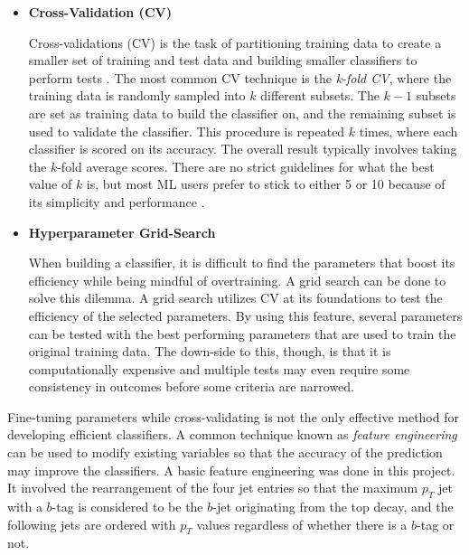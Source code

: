 \begin{itemize}
    \item \textbf{Cross-Validation (CV)} \par
    Cross-validations (CV) is the task of partitioning training data to create a smaller set of training and test data and building smaller classifiers to perform tests \cite{james2013introduction}. The most common CV technique is the \textit{k-fold CV}, where the training data is randomly sampled into $k$ different subsets. The $k-1$ subsets are set as training data to build the classifier on, and the remaining subset is used to validate the classifier. This procedure is repeated $k$ times, where each classifier is scored on its accuracy. The overall result typically involves taking the $k$-fold average scores.  There are no strict guidelines for what the best value of $k$ is, but most ML users prefer to stick to either 5 or 10 because of its simplicity and performance \cite{james2013introduction}. \\
    
    \item \textbf{Hyperparameter Grid-Search} \par
    When building a classifier, it is difficult to find the parameters that boost its efficiency while being mindful of overtraining. A grid search can be done to solve this dilemma. A grid search utilizes CV at its foundations to test the efficiency of the selected parameters. By using this feature, several parameters can be tested with the best performing parameters that are used to train the original training data. The down-side to this, though, is that it is computationally expensive and multiple tests may even require some consistency in outcomes before some criteria are narrowed. \\
\end{itemize}

Fine-tuning parameters while cross-validating is not the only effective method for developing efficient classifiers. A common technique known as \textit{feature engineering} can be used to modify existing variables so that the accuracy of the prediction may improve the classifiers. A basic feature engineering was done in this project. It involved the rearrangement of the four jet entries so that the maximum $p _T$ jet with a $b$-tag is considered to be the $b$-jet originating from the top decay, and the following jets are ordered with $p_T$ values regardless of whether there is a $b$-tag or not. \\

